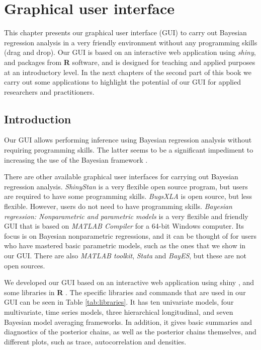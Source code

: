 \chapter{Graphical user interface}\label{chapGUI}

This chapter presents our graphical user interface (GUI) to carry out Bayesian regression analysis in a very friendly environment without any programming skills (drag and drop). Our GUI is based on an interactive web application using \textit{shiny}, and packages from \textbf{R} software, and is designed for teaching and applied purposes at an introductory level. In the next chapters of the second part of this book we carry out some applications to highlight the potential of our GUI for applied researchers and practitioners.

\section{Introduction}\label{secGUI1}

Our GUI allows performing inference using Bayesian regression analysis without requiring programming skills. The latter seems to be a significant impediment to increasing the use of the Bayesian framework \cite{Woodward2005,Karabatsos2016}.

There are other available graphical user interfaces for carrying out Bayesian regression analysis. \textit{ShinyStan} \cite{shinystan2017} is a very flexible open source program, but users are required to have some programming skills. \textit{BugsXLA} \cite{Woodward2005} is open source, but less flexible. However, users do not need to have programming skills. \textit{Bayesian regression: Nonparametric and parametric models} \cite{Karabatsos2016} is a very flexible and friendly GUI that is based on \textit{MATLAB Compiler} for a 64-bit Windows computer. Its focus is on Bayesian nonparametric regressions, and it can be thought of for users who have mastered basic parametric models, such as the ones that we show in our GUI. There are also \textit{MATLAB toolkit}, \textit{Stata} and \textit{BayES}, but these are not open sources.

We developed our GUI based on an interactive web application using shiny \cite{Chang2018}, and some libraries in \textbf{R} \cite{R2021}. The specific libraries and commands that are used in our GUI can be seen in Table \ref{tab:libraries}. It has ten univariate models, four multivariate, {\color{red}time series models}, three hierarchical longitudinal, and seven Bayesian model averaging frameworks. In addition, it gives basic summaries and diagnostics of the posterior chains, as well as the posterior chains themselves, and different plots, such as trace, autocorrelation and densities. 

